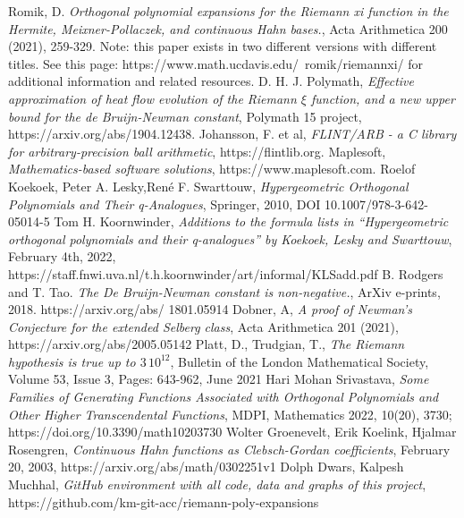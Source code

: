 \documentclass[a4paper,11pt,twoside]{amsart}
\begin{document}
\begin{thebibliography}{} 
Romik, D. \emph{Orthogonal polynomial expansions for the Riemann xi function in the Hermite, Meixner-Pollaczek, and continuous Hahn bases.}, Acta Arithmetica 200 (2021), 259-329.
Note: this paper exists in two different versions with different titles. See this page: https://www.math.ucdavis.edu/~romik/riemannxi/ for additional information and related resources. 
D. H. J. Polymath, \emph{Effective approximation of heat flow evolution of the Riemann $\xi$ function, and a new upper bound for the de Bruijn-Newman constant}, Polymath 15 project, https://arxiv.org/abs/1904.12438.
Johansson, F. et al, \emph{FLINT/ARB - a C library for arbitrary-precision ball arithmetic}, https://flintlib.org.
Maplesoft, \emph{Mathematics-based software solutions}, https://www.maplesoft.com.
Roelof Koekoek, Peter A. Lesky,René F. Swarttouw, \emph{Hypergeometric Orthogonal Polynomials and Their q-Analogues}, Springer, 2010, DOI 10.1007/978-3-642-05014-5
Tom H. Koornwinder, \emph{Additions to the formula lists in “Hypergeometric orthogonal polynomials and their q-analogues” by Koekoek, Lesky and Swarttouw}, February 4th, 2022, https://staff.fnwi.uva.nl/t.h.koornwinder/art/informal/KLSadd.pdf
B. Rodgers and T. Tao. \emph{The De Bruijn-Newman constant is non-negative.}, ArXiv e-prints, 2018. https://arxiv.org/abs/ 1801.05914
Dobner, A, \emph{A proof of Newman’s Conjecture for the extended Selberg class}, Acta Arithmetica 201 (2021), https://arxiv.org/abs/2005.05142
Platt, D., Trudgian, T., \emph{The Riemann hypothesis is true up to $3\,10^{12}$}, Bulletin of the London Mathematical Society, Volume 53, Issue 3, Pages: 643-962, June 2021
Hari Mohan Srivastava, \emph{Some Families of Generating Functions Associated with Orthogonal Polynomials and Other Higher Transcendental Functions}, MDPI, Mathematics 2022, 10(20), 3730; https://doi.org/10.3390/math10203730
Wolter Groenevelt, Erik Koelink, Hjalmar Rosengren, \emph{Continuous Hahn functions as Clebsch-Gordan coefficients}, February 20, 2003, https://arxiv.org/abs/math/0302251v1
Dolph Dwars, Kalpesh Muchhal, \emph{GitHub environment with all code, data and graphs of this project}, https://github.com/km-git-acc/riemann-poly-expansions
\end{thebibliography}{} 

\appendix
\appendixpage
\renewcommand{\theequation}{A.\arabic{equation}}
\setcounter{equation}{0}
\end{document}
